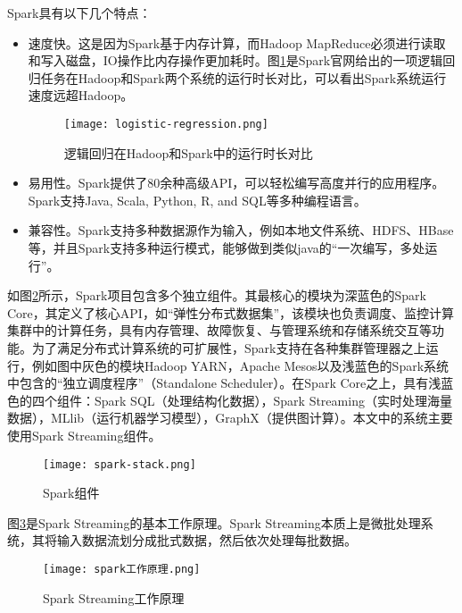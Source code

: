 Spark具有以下几个特点：

\begin{itemize}
  \item 速度快。这是因为Spark基于内存计算，而Hadoop MapReduce必须进行读取和写入磁盘，IO操作比内存操作更加耗时。图\ref{fig:Logistic regression in Hadoop and Spark}是Spark官网给出的一项逻辑回归任务在Hadoop和Spark两个系统的运行时长对比，可以看出Spark系统运行速度远超Hadoop。
   \begin{figure}
    \centering
    \texttt{[image: logistic-regression.png]}
    \caption{逻辑回归在Hadoop和Spark中的运行时长对比}
    \label{fig:Logistic regression in Hadoop and Spark}
  \end{figure}
  \item 易用性。Spark提供了80余种高级API，可以轻松编写高度并行的应用程序。Spark支持Java, Scala, Python, R, and SQL等多种编程语言。
  \item 兼容性。Spark支持多种数据源作为输入，例如本地文件系统、HDFS、HBase等，并且Spark支持多种运行模式，能够做到类似java的“一次编写，多处运行”。
\end{itemize}



如图\ref{fig:Spark组件}所示，Spark项目包含多个独立组件\cite{spark}。其最核心的模块为深蓝色的Spark Core，其定义了核心API，如“弹性分布式数据集”，该模块也负责调度、监控计算集群中的计算任务，具有内存管理、故障恢复、与管理系统和存储系统交互等功能。为了满足分布式计算系统的可扩展性，Spark支持在各种集群管理器之上运行，例如图中灰色的模块Hadoop YARN，Apache Mesos以及浅蓝色的Spark系统中包含的“独立调度程序”（Standalone Scheduler）。在Spark Core之上，具有浅蓝色的四个组件：Spark SQL（处理结构化数据），Spark Streaming（实时处理海量数据），MLlib（运行机器学习模型），GraphX（提供图计算）。本文中的系统主要使用Spark Streaming组件。



\begin{figure}
  \centering
  \texttt{[image: spark-stack.png]}
  \caption{Spark组件}
  \label{fig:Spark组件}
\end{figure}

图\ref{fig:spark工作原理}是Spark Streaming的基本工作原理\cite{spark}。Spark Streaming本质上是微批处理系统，其将输入数据流划分成批式数据，然后依次处理每批数据。
\begin{figure}
  \centering
  \texttt{[image: spark工作原理.png]}
  \caption{Spark Streaming工作原理}
  \label{fig:spark工作原理}
\end{figure}

